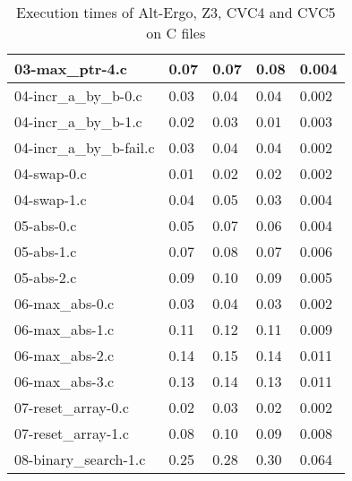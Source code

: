 \documentclass{article}
\begin{document}
\begin{table}[h]
\begin{tabular}{|l|l|l|l|l|}
03-max\_ptr-4.c              & 0.07                     & 0.07                 & 0.08                   & 0.004                 \\ \hline
04-incr\_a\_by\_b-0.c          & 0.03                     & 0.04                 & 0.04                   & 0.002                 \\ \hline
04-incr\_a\_by\_b-1.c          & 0.02                     & 0.03                 & 0.01                   & 0.003                 \\ \hline
04-incr\_a\_by\_b-fail.c       & 0.03                     & 0.04                 & 0.04                   & 0.002                 \\ \hline
04-swap-0.c                 & 0.01                     & 0.02                 & 0.02                   & 0.002                 \\ \hline
04-swap-1.c                 & 0.04                     & 0.05                 & 0.03                   & 0.004                 \\ \hline
05-abs-0.c                  & 0.05                     & 0.07                 & 0.06                   & 0.004                 \\ \hline
05-abs-1.c                  & 0.07                     & 0.08                 & 0.07                   & 0.006                 \\ \hline
05-abs-2.c                  & 0.09                     & 0.10                 & 0.09                   & 0.005                 \\ \hline
06-max\_abs-0.c              & 0.03                     & 0.04                 & 0.03                   & 0.002                 \\ \hline
06-max\_abs-1.c              & 0.11                     & 0.12                 & 0.11                   & 0.009                 \\ \hline
06-max\_abs-2.c              & 0.14                     & 0.15                 & 0.14                   & 0.011                 \\ \hline
06-max\_abs-3.c              & 0.13                     & 0.14                 & 0.13                   & 0.011                 \\ \hline
07-reset\_array-0.c          & 0.02                     & 0.03                 & 0.02                   & 0.002                 \\ \hline
07-reset\_array-1.c          & 0.08                     & 0.10                 & 0.09                   & 0.008                 \\ \hline
08-binary\_search-1.c        & 0.25                     & 0.28                 & 0.30                   & 0.064                 \\ \hline
\end{tabular}
\caption{Execution times of Alt-Ergo, Z3, CVC4 and CVC5 on C files}
\label{table:execution_times}
\end{table}
\end{document}
